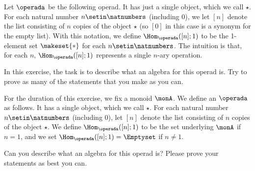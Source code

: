 
\begin{gradedexercise}
    \label{ex:MonoidsAsAlgebras}
    Let $\operada$ be the following operad.
    It has just a single object, which we call $\star$.
    For each natural number $n \setin \natnumbers$ (including $0$), we let $[n]$ denote the list consisting of $n$ copies of the object $\star$ (so $[0]$ in this case is a synonym for the empty list).
    With this notation, we define $\Hom_\operada([n];1)$ to be the 1-element set $\makeset{ * }$ for each $n \setin \natnumbers$.
    The intuition is that, for each $n$, $\Hom_\operada([n];1)$ represents a single $n$-ary operation.

    In this exercise, the task is to describe what an algebra for this operad is.
    Try to prove as many of the statements that you make as you can.
\end{gradedexercise}



\begin{gradedexercise}
    \label{ex:MonoidsActionsAsAlgebras}
    For the duration of this exercise, we fix a monoid $\monA$.
    We define an $\operada$ as follows.
    It has a single object, which we call $\star$.
    For each natural number $n \setin \natnumbers$ (including $0$), let $[n]$ denote the list consisting of $n$ copies of the object $\star$.
    We define $\Hom_\operada([n];1)$ to be the set underlying $\monA$ if $n =1$, and we set $\Hom_\operada([n];1) = \Emptyset$ if $n \neq 1$.

    Can you describe what an algebra for this operad is?
    Please prove your statements as best you can.
\end{gradedexercise}



\showslides{
    \begin{forslides}
        \begin{equation}
            \label{eq:composition_operad}
            [\mora,\morb]\mthen \morc
        \end{equation}
    \end{forslides}

}

